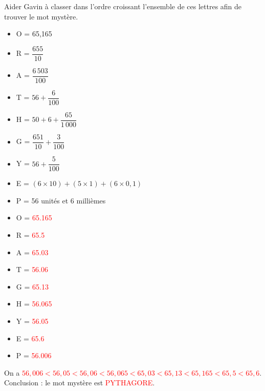 \begin{exercice*} %
    Aider Gavin à classer dans l'ordre croissant l'ensemble de ces lettres afin de trouver le mot mystère. \smallskip
    \begin{itemize}
       \item O = 65,165 \medskip
       \item R = $\dfrac{655}{10}$ \medskip
       \item A = $\dfrac{6\,503}{100}$ \medskip
       \item T = $56+\dfrac{6}{100}$ \medskip
       \item H = $50+6+\dfrac{65}{1\,000}$ \medskip
       \item G = $\dfrac{651}{10}+\dfrac{3}{100}$ \medskip
       \item Y = $56+\dfrac{5}{100}$ \medskip
       \item E = $(6\times10)+(5\times1)+(6\times0,1)$ \smallskip
       \item P = 56 unités et 6 millièmes
    \end{itemize}    
 \end{exercice*}
 
 \begin{corrige}
    \begin{itemize}
       \item O = \textcolor{red}{\num{65,165}}
       \item R = \textcolor{red}{\num{65,5}}
       \item A = \textcolor{red}{\num{65,03}}
       \item T = \textcolor{red}{\num{56,06}}
       \item G = \textcolor{red}{\num{65,13}}
       \item H = \textcolor{red}{\num{56,065}}
       \item Y = \textcolor{red}{\num{56,05}}
       \item E = \textcolor{red}{\num{65,6}}
       \item P = \textcolor{red}{\num{56,006}}
    \end{itemize}
    On a \textcolor{red}{$56,006 < 56,05 < 56,06 < 56,065 < 65,03 < 65,13 < 65,165 < 65,5 < 65,6$}. \\
    Conclusion : le mot mystère est \textcolor{red}{PYTHAGORE}. \\
 \end{corrige}